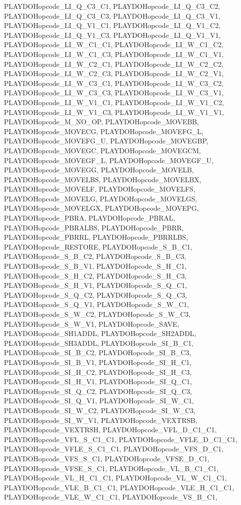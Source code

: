 PLAYDOHopcode\_\-LI\_\-Q\_\-C3\_\-C1, PLAYDOHopcode\_\-LI\_\-Q\_\-C3\_\-C2, PLAYDOHopcode\_\-LI\_\-Q\_\-C3\_\-C3, PLAYDOHopcode\_\-LI\_\-Q\_\-C3\_\-V1, PLAYDOHopcode\_\-LI\_\-Q\_\-V1\_\-C1, PLAYDOHopcode\_\-LI\_\-Q\_\-V1\_\-C2, PLAYDOHopcode\_\-LI\_\-Q\_\-V1\_\-C3, PLAYDOHopcode\_\-LI\_\-Q\_\-V1\_\-V1, PLAYDOHopcode\_\-LI\_\-W\_\-C1\_\-C1, PLAYDOHopcode\_\-LI\_\-W\_\-C1\_\-C2, PLAYDOHopcode\_\-LI\_\-W\_\-C1\_\-C3, PLAYDOHopcode\_\-LI\_\-W\_\-C1\_\-V1, PLAYDOHopcode\_\-LI\_\-W\_\-C2\_\-C1, PLAYDOHopcode\_\-LI\_\-W\_\-C2\_\-C2, PLAYDOHopcode\_\-LI\_\-W\_\-C2\_\-C3, PLAYDOHopcode\_\-LI\_\-W\_\-C2\_\-V1, PLAYDOHopcode\_\-LI\_\-W\_\-C3\_\-C1, PLAYDOHopcode\_\-LI\_\-W\_\-C3\_\-C2, PLAYDOHopcode\_\-LI\_\-W\_\-C3\_\-C3, PLAYDOHopcode\_\-LI\_\-W\_\-C3\_\-V1, PLAYDOHopcode\_\-LI\_\-W\_\-V1\_\-C1, PLAYDOHopcode\_\-LI\_\-W\_\-V1\_\-C2, PLAYDOHopcode\_\-LI\_\-W\_\-V1\_\-C3, PLAYDOHopcode\_\-LI\_\-W\_\-V1\_\-V1, PLAYDOHopcode\_\-M\_\-NO\_\-OP, PLAYDOHopcode\_\-MOVEBB, PLAYDOHopcode\_\-MOVECG, PLAYDOHopcode\_\-MOVEFG\_\-L, PLAYDOHopcode\_\-MOVEFG\_\-U, PLAYDOHopcode\_\-MOVEGBP, PLAYDOHopcode\_\-MOVEGC, PLAYDOHopcode\_\-MOVEGCM, PLAYDOHopcode\_\-MOVEGF\_\-L, PLAYDOHopcode\_\-MOVEGF\_\-U, PLAYDOHopcode\_\-MOVEGG, PLAYDOHopcode\_\-MOVELB, PLAYDOHopcode\_\-MOVELBS, PLAYDOHopcode\_\-MOVELBX, PLAYDOHopcode\_\-MOVELF, PLAYDOHopcode\_\-MOVELFS, PLAYDOHopcode\_\-MOVELG, PLAYDOHopcode\_\-MOVELGS, PLAYDOHopcode\_\-MOVELGX, PLAYDOHopcode\_\-MOVEPG, PLAYDOHopcode\_\-PBRA, PLAYDOHopcode\_\-PBRAL, PLAYDOHopcode\_\-PBRALBS, PLAYDOHopcode\_\-PBRR, PLAYDOHopcode\_\-PBRRL, PLAYDOHopcode\_\-PBRRLBS, PLAYDOHopcode\_\-RESTORE, PLAYDOHopcode\_\-S\_\-B\_\-C1, PLAYDOHopcode\_\-S\_\-B\_\-C2, PLAYDOHopcode\_\-S\_\-B\_\-C3, PLAYDOHopcode\_\-S\_\-B\_\-V1, PLAYDOHopcode\_\-S\_\-H\_\-C1, PLAYDOHopcode\_\-S\_\-H\_\-C2, PLAYDOHopcode\_\-S\_\-H\_\-C3, PLAYDOHopcode\_\-S\_\-H\_\-V1, PLAYDOHopcode\_\-S\_\-Q\_\-C1, PLAYDOHopcode\_\-S\_\-Q\_\-C2, PLAYDOHopcode\_\-S\_\-Q\_\-C3, PLAYDOHopcode\_\-S\_\-Q\_\-V1, PLAYDOHopcode\_\-S\_\-W\_\-C1, PLAYDOHopcode\_\-S\_\-W\_\-C2, PLAYDOHopcode\_\-S\_\-W\_\-C3, PLAYDOHopcode\_\-S\_\-W\_\-V1, PLAYDOHopcode\_\-SAVE, PLAYDOHopcode\_\-SH1ADDL, PLAYDOHopcode\_\-SH2ADDL, PLAYDOHopcode\_\-SH3ADDL, PLAYDOHopcode\_\-SI\_\-B\_\-C1, PLAYDOHopcode\_\-SI\_\-B\_\-C2, PLAYDOHopcode\_\-SI\_\-B\_\-C3, PLAYDOHopcode\_\-SI\_\-B\_\-V1, PLAYDOHopcode\_\-SI\_\-H\_\-C1, PLAYDOHopcode\_\-SI\_\-H\_\-C2, PLAYDOHopcode\_\-SI\_\-H\_\-C3, PLAYDOHopcode\_\-SI\_\-H\_\-V1, PLAYDOHopcode\_\-SI\_\-Q\_\-C1, PLAYDOHopcode\_\-SI\_\-Q\_\-C2, PLAYDOHopcode\_\-SI\_\-Q\_\-C3, PLAYDOHopcode\_\-SI\_\-Q\_\-V1, PLAYDOHopcode\_\-SI\_\-W\_\-C1, PLAYDOHopcode\_\-SI\_\-W\_\-C2, PLAYDOHopcode\_\-SI\_\-W\_\-C3, PLAYDOHopcode\_\-SI\_\-W\_\-V1, PLAYDOHopcode\_\-VEXTRSB, PLAYDOHopcode\_\-VEXTRSH, PLAYDOHopcode\_\-VFL\_\-D\_\-C1\_\-C1, PLAYDOHopcode\_\-VFL\_\-S\_\-C1\_\-C1, PLAYDOHopcode\_\-VFLE\_\-D\_\-C1\_\-C1, PLAYDOHopcode\_\-VFLE\_\-S\_\-C1\_\-C1, PLAYDOHopcode\_\-VFS\_\-D\_\-C1, PLAYDOHopcode\_\-VFS\_\-S\_\-C1, PLAYDOHopcode\_\-VFSE\_\-D\_\-C1, PLAYDOHopcode\_\-VFSE\_\-S\_\-C1, PLAYDOHopcode\_\-VL\_\-B\_\-C1\_\-C1, PLAYDOHopcode\_\-VL\_\-H\_\-C1\_\-C1, PLAYDOHopcode\_\-VL\_\-W\_\-C1\_\-C1, PLAYDOHopcode\_\-VLE\_\-B\_\-C1\_\-C1, PLAYDOHopcode\_\-VLE\_\-H\_\-C1\_\-C1, PLAYDOHopcode\_\-VLE\_\-W\_\-C1\_\-C1, PLAYDOHopcode\_\-VS\_\-B\_\-C1, 